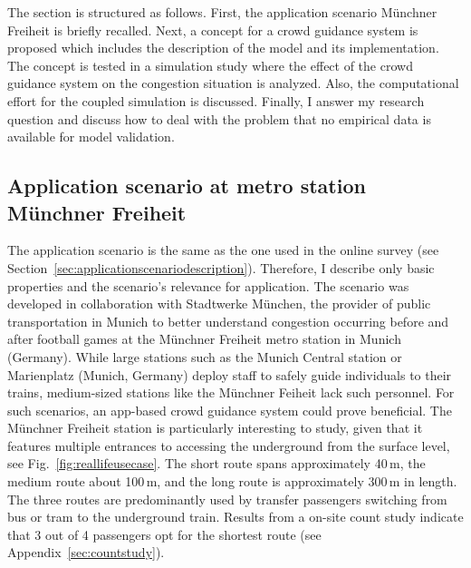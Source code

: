The section is structured as follows. First, the application scenario Münchner Freiheit is briefly recalled. Next, a concept for a crowd guidance system is proposed which includes the description of the model and its implementation.  The concept is tested in a simulation study where the effect of the crowd guidance system on the congestion situation is analyzed. Also, the computational effort for the coupled simulation is discussed. Finally, I answer my research question and discuss how to deal with the problem that no empirical data is available for model validation.



\subsection{Application scenario at metro station Münchner Freiheit}

The application scenario is the same as the one used in the online survey (see Section~\ref{sec:applicationscenariodescription}). Therefore, I describe only basic properties and the scenario's relevance for application.
The scenario was developed in collaboration with Stadtwerke München, the provider of public transportation in Munich to better understand congestion occurring before and after football games at the Münchner Freiheit metro station in Munich (Germany). While large stations such as the Munich Central station or Marienplatz (Munich, Germany) deploy staff to safely guide individuals to their trains, medium-sized stations like the Münchner Feiheit lack such personnel. For  such scenarios, an app-based crowd guidance system could prove beneficial.
The Münchner Freiheit station is particularly interesting to study, given that it features multiple entrances to accessing the underground from the surface level, see Fig.~\ref{fig:reallifeusecase}. The short route spans approximately 40\,m, the medium route about 100\,m, and the long route is approximately 300\,m in length. The three routes are predominantly used by transfer passengers switching from bus or tram to the underground train.  Results from a on-site count study indicate that 3 out of 4 passengers opt for the shortest route (see Appendix~\ref{sec:countstudy}).

